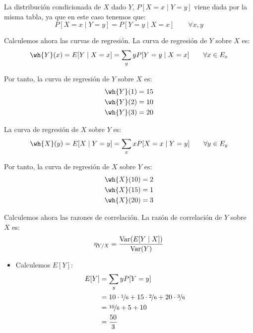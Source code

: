 \begin{ejercicio}
\begin{enumerate}
        La distribución condicionada de $X$ dado $Y$, $P[X = x\mid Y = y]$ viene dada por la misma tabla, ya que en este caso tenemos que:
        \begin{equation*}
            P[X = x\mid Y = y] = P[Y = y\mid X = x] \qquad \forall x, y
        \end{equation*}

        Calculemos ahora las curvas de regresión. La curva de regresión de $Y$ sobre $X$ es:
        \begin{equation*}
            \wh{Y}(x) = E[Y\mid X = x] = \sum_{y} y P[Y = y\mid X = x] \qquad \forall x\in E_x
        \end{equation*}

        Por tanto, la curva de regresión de $Y$ sobre $X$ es:
        \begin{align*}
            \wh{Y}(1) &= 15\\
            \wh{Y}(2) &= 10\\
            \wh{Y}(3) &= 20
        \end{align*}

        La curva de regresión de $X$ sobre $Y$ es:
        \begin{equation*}
            \wh{X}(y) = E[X\mid Y = y] = \sum_{x} x P[X = x\mid Y = y] \qquad \forall y\in E_y
        \end{equation*}

        Por tanto, la curva de regresión de $X$ sobre $Y$ es:
        \begin{align*}
            \wh{X}(10) &= 2\\
            \wh{X}(15) &= 1\\
            \wh{X}(20) &= 3
        \end{align*}

        Calculemos ahora las razones de correlación. La razón de correlación de $Y$ sobre $X$ es:
        \begin{equation*}
            \eta_{Y/X} = \dfrac{\operatorname{Var}(E[Y\mid X])}{\operatorname{Var}(Y)}
        \end{equation*}
        \begin{itemize}
            \item Calculemos $E[Y]$:
            \begin{align*}
                E[Y] &= \sum_{y} y P[Y = y]\\
                &= 10 \cdot \nicefrac{1}{6} + 15 \cdot \nicefrac{2}{6} + 20 \cdot \nicefrac{3}{6}\\
                &= \nicefrac{10}{6} + 5 + 10\\
                &= \frac{50}{3}
            \end{align*}


\end{itemize}
\end{enumerate}
\end{ejercicio}

